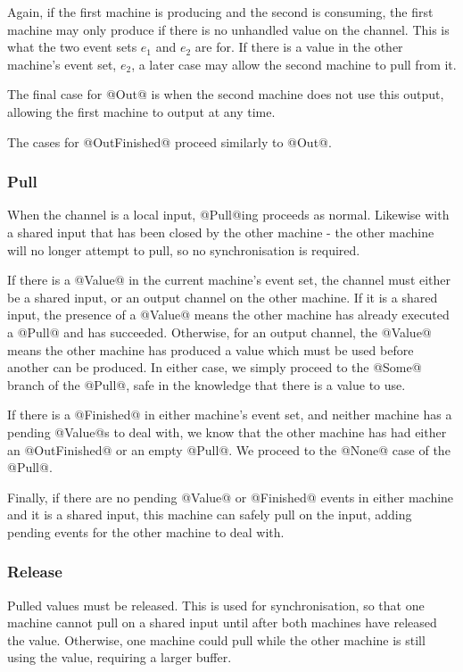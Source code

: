 Again, if the first machine is producing and the second is consuming, the first machine may only produce if there is no unhandled value on the channel.
This is what the two event sets $e_1$ and $e_2$ are for.
If there is a value in the other machine's event set, $e_2$, a later case may allow the second machine to pull from it.

The final case for @Out@ is when the second machine does not use this output, allowing the first machine to output at any time.

The cases for @OutFinished@ proceed similarly to @Out@.

\subsubsection{Pull}
When the channel is a local input, @Pull@ing proceeds as normal.
Likewise with a shared input that has been closed by the other machine - the other machine will no longer attempt to pull, so no synchronisation is required.

If there is a @Value@ in the current machine's event set, the channel must either be a shared input, or an output channel on the other machine.
If it is a shared input, the presence of a @Value@ means the other machine has already executed a @Pull@ and has succeeded.
Otherwise, for an output channel, the @Value@ means the other machine has produced a value which must be used before another can be produced.
In either case, we simply proceed to the @Some@ branch of the @Pull@, safe in the knowledge that there is a value to use.

If there is a @Finished@ in either machine's event set, and neither machine has a pending @Value@s to deal with, we know that the other machine has had either an @OutFinished@ or an empty @Pull@.
We proceed to the @None@ case of the @Pull@.

Finally, if there are no pending @Value@ or @Finished@ events in either machine and it is a shared input, this machine can safely pull on the input, adding pending events for the other machine to deal with.


\subsubsection{Release}
Pulled values must be released.
This is used for synchronisation, so that one machine cannot pull on a shared input until after both machines have released the value.
Otherwise, one machine could pull while the other machine is still using the value, requiring a larger buffer.

